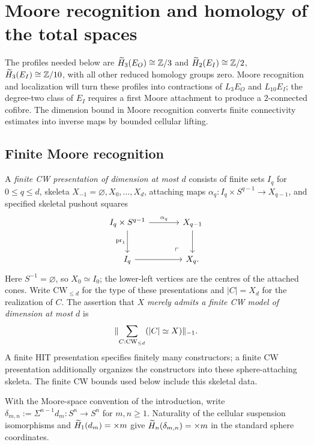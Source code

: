 \section{Moore recognition and homology of the total spaces}\label{sec:homology}

The profiles needed below are $\widetilde H_3(E_O)\cong\mathbb Z/3$ and $\widetilde H_2(E_I)\cong\mathbb Z/2$, $\widetilde H_3(E_I)\cong\mathbb Z/10$, with all other reduced homology groups zero. Moore recognition and localization will turn these profiles into contractions of $L_3E_O$ and $L_{10}E_I$; the degree-two class of $E_I$ requires a first Moore attachment to produce a $2$-connected cofibre. The dimension bound in Moore recognition converts finite connectivity estimates into inverse maps by bounded cellular lifting.

\subsection{Finite Moore recognition}

\begin{definition}
A \emph{finite CW presentation of dimension at most $d$} consists of finite sets $I_q$ for $0\leq q\leq d$, skeleta $X_{-1}=\varnothing,X_0,\ldots,X_d$, attaching maps $\alpha_q:I_q\times S^{q-1}\to X_{q-1}$, and specified skeletal pushout squares
\[
\begin{tikzcd}[column sep=large,row sep=large]
I_q\times S^{q-1} \arrow[r,"\alpha_q"] \arrow[d,"\operatorname{pr}_1"'] \pomark & X_{q-1} \arrow[d] \\
I_q \arrow[r] & X_q.
\end{tikzcd}
\]
Here $S^{-1}=\varnothing$, so $X_0\simeq I_0$; the lower-left vertices are the centres of the attached cones. Write $\mathrm{CW}_{\leq d}$ for the type of these presentations and $|C|=X_d$ for the realization of $C$. The assertion that $X$ \emph{merely admits a finite CW model of dimension at most $d$} is
\[
\lVert \sum_{C:\mathrm{CW}_{\leq d}}(|C|\simeq X)\rVert_{-1}.
\]
A finite HIT presentation specifies finitely many constructors; a finite CW presentation additionally organizes the constructors into these sphere-attaching skeleta. The finite CW bounds used below include this skeletal data.
\end{definition}

With the Moore-space convention of the introduction, write $\delta_{m,n}:=\Sigma^{n-1}d_m:S^n\to S^n$ for $m,n\geq1$. Naturality of the cellular suspension isomorphisms and $\widetilde H_1(d_m)=\times m$ give $\widetilde H_n(\delta_{m,n})=\times m$ in the standard sphere coordinates.

